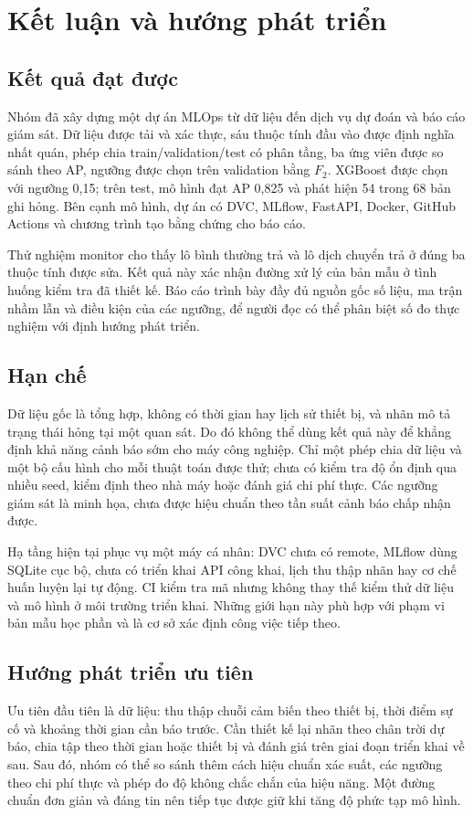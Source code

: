 \chapter{Kết luận và hướng phát triển}
\section{Kết quả đạt được}
Nhóm đã xây dựng một dự án MLOps từ dữ liệu \dataset{} đến dịch vụ dự đoán và báo cáo giám sát. Dữ liệu được tải và xác thực, sáu thuộc tính đầu vào được định nghĩa nhất quán, phép chia train/validation/test có phân tầng, ba ứng viên được so sánh theo AP, ngưỡng được chọn trên validation bằng $F_2$. XGBoost được chọn với ngưỡng 0,15; trên test, mô hình đạt AP 0,825 và phát hiện 54 trong 68 bản ghi hỏng. Bên cạnh mô hình, dự án có DVC, MLflow, FastAPI, Docker, GitHub Actions và chương trình tạo bằng chứng cho báo cáo.

Thử nghiệm monitor cho thấy lô bình thường trả  và lô dịch chuyển trả  ở đúng ba thuộc tính được sửa. Kết quả này xác nhận đường xử lý của bản mẫu ở tình huống kiểm tra đã thiết kế. Báo cáo trình bày đầy đủ nguồn gốc số liệu, ma trận nhầm lẫn và điều kiện của các ngưỡng, để người đọc có thể phân biệt số đo thực nghiệm với định hướng phát triển.

\section{Hạn chế}
Dữ liệu gốc là tổng hợp, không có thời gian hay lịch sử thiết bị, và nhãn mô tả trạng thái hỏng tại một quan sát. Do đó không thể dùng kết quả này để khẳng định khả năng cảnh báo sớm cho máy công nghiệp. Chỉ một phép chia dữ liệu và một bộ cấu hình cho mỗi thuật toán được thử; chưa có kiểm tra độ ổn định qua nhiều seed, kiểm định theo nhà máy hoặc đánh giá chi phí thực. Các ngưỡng giám sát là minh họa, chưa được hiệu chuẩn theo tần suất cảnh báo chấp nhận được.

Hạ tầng hiện tại phục vụ một máy cá nhân: DVC chưa có remote, MLflow dùng SQLite cục bộ, chưa có triển khai API công khai, lịch thu thập nhãn hay cơ chế huấn luyện lại tự động. CI kiểm tra mã nhưng không thay thế kiểm thử dữ liệu và mô hình ở môi trường triển khai. Những giới hạn này phù hợp với phạm vi bản mẫu học phần và là cơ sở xác định công việc tiếp theo.

\section{Hướng phát triển ưu tiên}
Ưu tiên đầu tiên là dữ liệu: thu thập chuỗi cảm biến theo thiết bị, thời điểm sự cố và khoảng thời gian cần báo trước. Cần thiết kế lại nhãn theo chân trời dự báo, chia tập theo thời gian hoặc thiết bị và đánh giá trên giai đoạn triển khai về sau. Sau đó, nhóm có thể so sánh thêm cách hiệu chuẩn xác suất, các ngưỡng theo chi phí thực và phép đo độ không chắc chắn của hiệu năng. Một đường chuẩn đơn giản và đáng tin nên tiếp tục được giữ khi tăng độ phức tạp mô hình.

